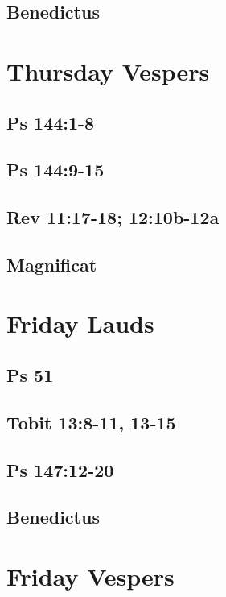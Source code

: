 \subsection{Benedictus}


\section{Thursday Vespers}

\subsection{Ps 144:1-8}

\subsection{Ps 144:9-15}

\subsection{Rev 11:17-18; 12:10b-12a}

\subsection{Magnificat}


\section{Friday Lauds}

\subsection{Ps 51}

\subsection{Tobit 13:8-11, 13-15}

\subsection{Ps 147:12-20}

\subsection{Benedictus}


\section{Friday Vespers}

